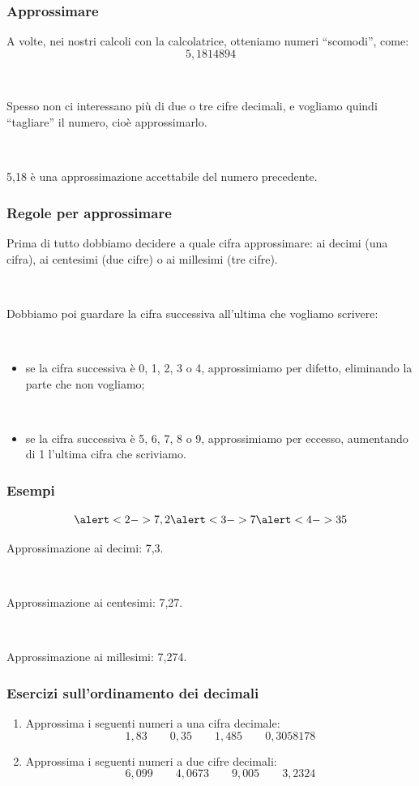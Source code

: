 \documentclass[handout]{beamer}
\theoremstyle{plain}
\begin{document}
\begin{frame}
\frametitle{Approssimare}
A volte, nei nostri calcoli con la calcolatrice, otteniamo numeri ``scomodi'', come:
\[5,1814894\]

~

Spesso non ci interessano più di \alert{due o tre cifre decimali}, e vogliamo quindi ``tagliare'' il numero, cioè \alert{approssimarlo}.\pause

~

5,18 è una approssimazione accettabile del numero precedente.
\end{frame}



\begin{frame}
\frametitle{Regole per approssimare}
Prima di tutto dobbiamo \alert{decidere a quale cifra approssimare}: ai decimi (una cifra), ai centesimi (due cifre) o ai millesimi (tre cifre).\pause

~

Dobbiamo poi guardare \alert{la cifra successiva all'ultima che vogliamo scrivere}:\pause

~
\begin{itemize}
  \item se la cifra successiva è 0, 1, 2, 3 o 4, approssimiamo per \alert{difetto}, eliminando la parte che non vogliamo;\pause
  
  ~
  \item se la cifra successiva è 5, 6, 7, 8 o 9, approssimiamo per \alert{eccesso}, aumentando di 1 l'ultima cifra che scriviamo.
\end{itemize}
\end{frame}



\begin{frame}
\frametitle{Esempi}
\[\alert<2->{7,2}\alert<3->{7}\alert<4->{3}5\]\pause

Approssimazione ai decimi: 7,3.\pause

~

Approssimazione ai centesimi: 7,27.\pause

~

Approssimazione ai millesimi: 7,274.
\end{frame}




\begin{frame}
\frametitle{Esercizi sull'ordinamento dei decimali}
\begin{enumerate}
  \item Approssima i seguenti numeri a una cifra decimale:
    \[ 1,83\qquad0,35\qquad1,485\qquad0,3058178 \]
  \item Approssima i seguenti numeri a due cifre decimali:
    \[ 6,099\qquad4,0673\qquad9,005\qquad3,2324 \]

\end{enumerate}
\end{frame}
\end{document}
